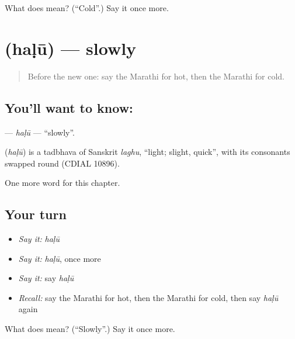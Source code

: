 \begin{tcolorbox}[breakable,colback=teal!4,colframe=teal!35!black,title={Before you move on}]
What does  mean? (\textquotedblleft{}Cold\textquotedblright{}.) Say it once more.
\end{tcolorbox}
\section[\texorpdfstring{\mr{हळू} (haḷū)}{हळू (haḷū)}]{ (haḷū) — slowly}

\label{lesson:MR-C104-halu}



\begin{quote}
Before the new one: say the Marathi for hot, then the Marathi for cold.
\end{quote}

\subsection*{You'll want to know: }
\textbf{} — \emph{haḷū} — \textquotedblleft{}slowly\textquotedblright{}.

\begin{cousinweb}
\textbf{} (\emph{haḷū}) is a tadbhava of Sanskrit \emph{laghu}, \textquotedblleft{}light; slight, quick\textquotedblright{}, with its consonants swapped round (CDIAL 10896).
\end{cousinweb}

\begin{grammarlens}[title={What you've built}]
One more word for this chapter.
\end{grammarlens}

\subsection*{Your turn}
\begin{itemize}
\raggedright
  \item \emph{Say it:} \emph{haḷū}
  \item \emph{Say it:} \emph{haḷū}, once more
  \item \emph{Say it:} say \emph{haḷū}
  \item \emph{Recall:} say the Marathi for hot, then the Marathi for cold, then say \emph{haḷū} again
\end{itemize}

\begin{tcolorbox}[breakable,colback=teal!4,colframe=teal!35!black,title={Before you move on}]
What does  mean? (\textquotedblleft{}Slowly\textquotedblright{}.) Say it once more.
\end{tcolorbox}
